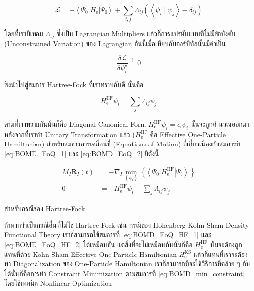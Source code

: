 \begin{equation}
  \mathcal{L}
  =
  - \left\langle\Psi_0\left| H_{\mathrm{e}}\right| \Psi_0\right\rangle
  + \sum_{i, j} \Lambda_{i j}\left(\left\langle\psi_i \mid \psi_j\right\rangle-\delta_{i j}\right)
\end{equation}

\noindent โดยที่เรามีเทอม $\Lambda_{i j}$ ซึ่งเป็น Lagrangian Multipliers แล้วก็การแปรผันแบบที่ไม่มีข้อบังคับ (Unconstrained
Variation) ของ Lagrangian อันนี้เมื่อเทียบกับออร์บิทัลนั้นมีค่าเป็น

\begin{equation}
  \frac{\delta \mathcal{L}}{\delta \psi_i^{\star}} \stackrel{!}{=} 0
\end{equation}

\noindent ซึ่งนำไปสู่สมการ Hartree-Fock ที่เราทราบกันดี นั่นคือ

\begin{equation}
  H_{\mathrm{e}}^{\mathrm{HF}} \psi_i=\sum_j \Lambda_{i j} \psi_j
\end{equation}

\noindent ตามที่เราทราบกันนั่นก็คือ Diagonal Canonical Form $ H_{\mathrm{e}}^{\mathrm{HF}} \psi_i=\epsilon_i \psi_i$
นั้นจะถูกคำนวณออกมาหลังจากที่เราทำ Unitary Transformation แล้ว ($H_{\mathrm{e}}^{\mathrm{HF}}$ คือ Effective
One-Particle Hamiltonian) สำหรับสมการการเคลื่อนที่ (Equations of Motion) ที่เกี่ยวเนื่องกับสมการที่ \eqref{eq:BOMD_EoQ_1} และ
\eqref{eq:BOMD_EoQ_2} มีดังนี้

\begin{align}
  \label{eq:BOMD_EoQ_HF_1}
  M_I \ddot{\mathbf{R}}_I(t)
   & =
  -\nabla_I \min _{\left\{\psi_i\right\}}\left\{\left\langle\Psi_0\left|
  H_{\mathrm{e}}^{\mathrm{HF}}\right| \Psi_0\right\rangle\right\} \\
  \label{eq:BOMD_EoQ_HF_2}
  0
   & =
  - H_{\mathrm{e}}^{\mathrm{HF}} \psi_i+\sum_j \Lambda_{i j} \psi_j
\end{align}

\noindent สำหรับกรณีของ Hartree-Fock

ถ้าหากว่าเป็นกรณีอื่นที่ไม่ใช่ Hartree-Fock เช่น กรณีของ Hohenberg-Kohn-Sham Density Functional Theory เราก็สามารถใช้สมการที่
\eqref{eq:BOMD_EoQ_HF_1} และ \eqref{eq:BOMD_EoQ_HF_2} ได้เหมือนกัน แต่สิ่งที่จะไม่เหมือนกันนั่นก็คือ $H_{\mathrm{e}}^{\mathrm{HF}}$
นั้นจะต้องถูกแทนที่ด้วย Kohn-Sham Effective One-Particle Hamiltonian $H_{\mathrm{e}}^{\mathrm{KS}}$ แล้วก็แทนที่เราจะต้องทำ
Diagonalization ของ One-Particle Hamiltonian เราก็สามารถที่จะใช้วิธีการที่คล้าย ๆ กันได้นั่นก็คือการทำ Constraint Minimization
ตามสมการที่ \eqref{eq:BOMD_min_constraint} โดยใช้เทคนิค Nonlinear Optimization

